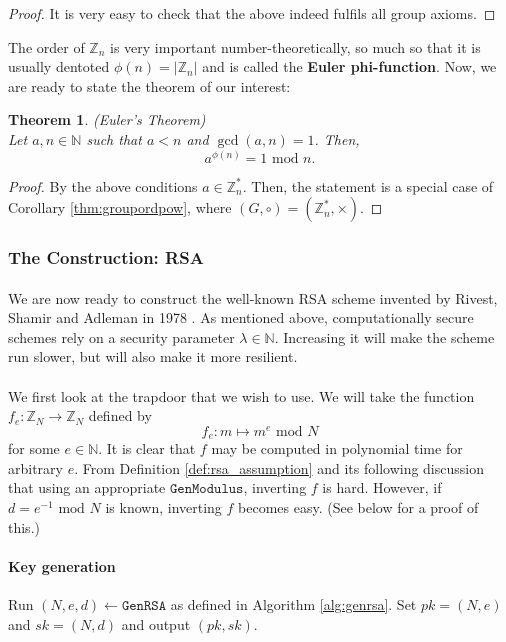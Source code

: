 \documentclass{article}
\newtheorem{theorem}{Theorem}[section]
\theoremstyle{definition}
\theoremstyle{example}
\newcommand{\Int}{\mathbb{Z}}
\newcommand{\Nat}{\mathbb{N}}
\renewcommand{\mod}{\,\,\text{mod}\,\,}
\newcommand{\GenModulus}{\texttt{GenModulus}}
\newcommand{\GenRSA}{\texttt{GenRSA}}
\begin{document}
\begin{proof}
  It is very easy to check that the above indeed fulfils all group axioms.
\end{proof}
The order of $\Int_n$ is very important number-theoretically, so much so that it
is usually dentoted $\phi(n) = |\Int_n|$ and is called the \textbf{Euler phi-function}.
Now, we are ready to state the theorem of our interest:
\begin{theorem}{(Euler's Theorem)}\\
  \label{thm:eulersthm}
  Let $a, n \in \Nat$ such that $a < n$ and $\gcd(a, n) = 1$. Then,
  \[
    a^{\phi(n)} = 1 \mod n.
  \]
\end{theorem}
\begin{proof}
  By the above conditions $a \in \Int^*_n$. Then, the statement is a special
  case of Corollary \ref{thm:groupordpow}, where $(G, \circ) = (\Int^*_n, \times)$.
\end{proof}
\subsubsection{The Construction: RSA}
\paragraph{}
We are now ready to construct the well-known RSA scheme invented by Rivest,
Shamir and Adleman in 1978 \cite{rivest1978method}. As mentioned above, computationally secure schemes rely on
a security parameter $\lambda \in \Nat$. Increasing it will make the scheme run
slower, but will also make it more resilient. 
\paragraph{}
We first look at the trapdoor that we wish to use. We will take the function $f_e:
\Int_N \to \Int_N$ defined by
\[
  f_e: m \mapsto m^e \mod N 
\]
for some $e \in\Nat$.
It is clear that $f$ may be computed in polynomial time for arbitrary $e$. From Definition
\ref{def:rsa_assumption} and its following discussion that using an appropriate
$\GenModulus$, inverting $f$ is hard. However, if $d = e^{-1} \mod N$ is known,
inverting $f$ becomes easy. (See below for a proof of this.)
\paragraph{Key generation}
Run $(N, e, d) \leftarrow\GenRSA$ as defined in Algorithm \ref{alg:genrsa}. Set
$pk = (N, e)$ and $sk = (N, d)$ and output $(pk, sk)$.
\end{document}
